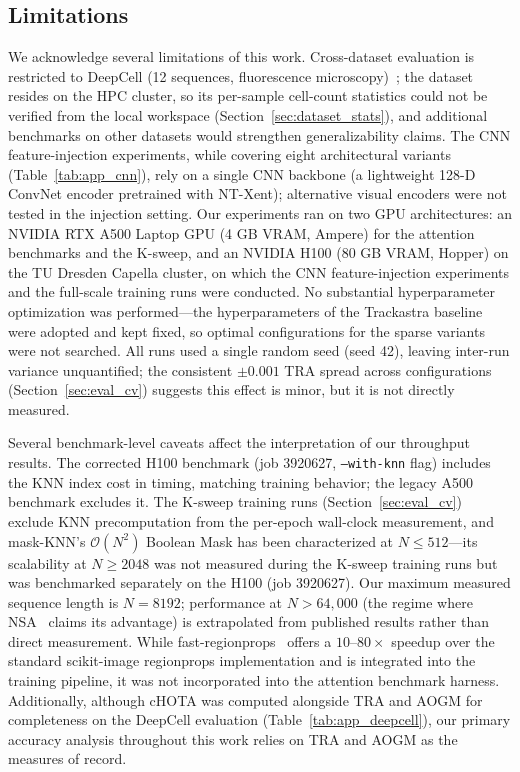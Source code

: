 \subsection{Limitations}

We acknowledge several limitations of this work. Cross-dataset evaluation is restricted to DeepCell (12 sequences, fluorescence microscopy)~\cite{schwartz2023}; the dataset resides on the HPC cluster, so its per-sample cell-count statistics could not be verified from the local workspace (Section~\ref{sec:dataset_stats}), and additional benchmarks on other datasets would strengthen generalizability claims. The CNN feature-injection experiments, while covering eight architectural variants (Table~\ref{tab:app_cnn}), rely on a single CNN backbone (a lightweight 128-D ConvNet encoder pretrained with NT-Xent); alternative visual encoders were not tested in the injection setting. Our experiments ran on two GPU architectures: an NVIDIA RTX A500 Laptop GPU (4 GB VRAM, Ampere) for the attention benchmarks and the K-sweep, and an NVIDIA H100 (80 GB VRAM, Hopper) on the TU Dresden Capella cluster, on which the CNN feature-injection experiments and the full-scale training runs were conducted. No substantial hyperparameter optimization was performed---the hyperparameters of the Trackastra baseline were adopted and kept fixed, so optimal configurations for the sparse variants were not searched. All runs used a single random seed (seed 42), leaving inter-run variance unquantified; the consistent $\pm 0.001$ TRA spread across configurations (Section~\ref{sec:eval_cv}) suggests this effect is minor, but it is not directly measured.

Several benchmark-level caveats affect the interpretation of our throughput results. The corrected H100 benchmark (job 3920627, \texttt{--with-knn} flag) includes the KNN index cost in timing, matching training behavior; the legacy A500 benchmark excludes it. The K-sweep training runs (Section~\ref{sec:eval_cv}) exclude KNN precomputation from the per-epoch wall-clock measurement, and mask-KNN's $\mathcal{O}(N^2)$ Boolean Mask has been characterized at $N \leq 512$---its scalability at $N \geq 2048$ was not measured during the K-sweep training runs but was benchmarked separately on the H100 (job 3920627). Our maximum measured sequence length is $N = 8192$; performance at $N > 64{,}000$ (the regime where NSA~\cite{yuan2025native} claims its advantage) is extrapolated from published results rather than direct measurement. While fast-regionprops~\cite{weigert2025fastregionprops} offers a $10$--$80\times$ speedup over the standard scikit-image regionprops implementation and is integrated into the training pipeline, it was not incorporated into the attention benchmark harness. Additionally, although cHOTA was computed alongside TRA and AOGM for completeness on the DeepCell evaluation (Table~\ref{tab:app_deepcell}), our primary accuracy analysis throughout this work relies on TRA and AOGM as the measures of record.

